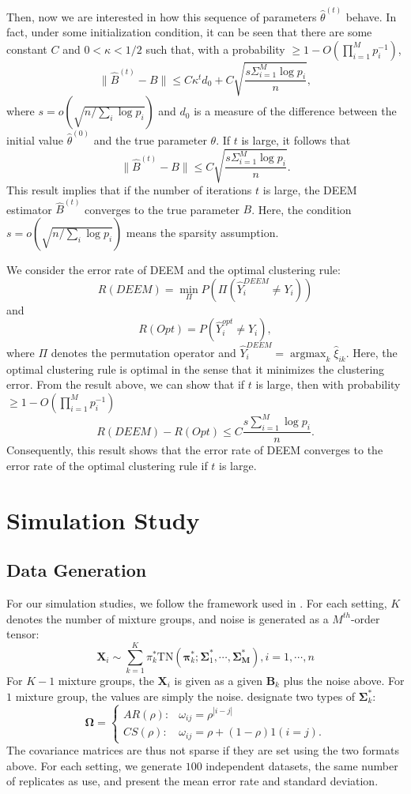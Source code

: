\documentclass[11pt]{article}
\newcommand{\amax}{\operatorname*{argmax}}
\newcommand{\wh}{\widehat}
\begin{document}
Then, now we are interested in how this sequence of parameters $\wh\theta^{(t)}$ behave.
In fact, under some initialization condition, it can be seen that there are some constant $C$ and $0<\kappa<1/2$ such that, with a probability $\ge 1- O(\prod_{i=1}^M p_i^{-1})$,
$$
\|\wh B^{(t)} - B\| \le C \kappa^t d_0 + C\sqrt{\frac{s \Sigma_{i=1}^M \log p_i}{n}},
$$
where $s=o(\sqrt{n/\sum_i \log p_i})$ and $d_0$ is a measure of the difference between the initial value $\wh \theta^{(0)}$ and the true parameter $\theta$.
If  $t$ is large, it follows that
$$
\|\wh B^{(t)} - B\| \le C\sqrt{\frac{s \Sigma_{i=1}^M \log p_i}{n}}.
$$
This result implies that if the number of iterations $t$ is large, the DEEM estimator $\wh B^{(t)}$ converges to the true parameter $B$.
Here, the condition $s=o(\sqrt{n/\sum_i \log p_i})$ means the sparsity assumption.

We consider the error rate of DEEM and the optimal clustering rule:
$$
R(DEEM)= \min_{\Pi} P(\Pi(\wh Y_i^{DEEM} \neq Y_i))
$$
and
$$
R(Opt)= P(\wh Y_i^{opt} \neq Y_i),
$$
where $\Pi$ denotes the permutation operator and $\wh Y_i^{DEEM}= \amax_k \wh\xi_{ik}$.
Here, the optimal clustering rule is optimal in the sense that it minimizes the clustering error.
From the result above, we can show that if $t$ is large, then with probability $\ge 1- O(\prod_{i=1}^M p_i^{-1})$
$$
R(DEEM) - R(Opt) \le C \frac{s\sum_{i=1}^M \log p_i}{n}.
$$
Consequently, this result shows that the error rate of DEEM converges to the error rate of the optimal clustering rule if $t$ is large.


\section{Simulation Study}

\subsection{Data Generation}

For our simulation studies, we follow the framework used in \cite{mai2022DEEM}. For each setting, $K$ denotes the number of mixture groups, and noise is generated as a $M^{th}$-order tensor:  
\begin{equation}
    \mathbf{X}_i \sim \sum_{k=1}^K \pi^*_k \mbox{TN} (\boldsymbol{\pi}^*_k; \boldsymbol{\Sigma}^*_1, \cdots, \boldsymbol{\Sigma^*_M}), i = 1, \cdots, n
\end{equation}
For $K-1$ mixture groups, the $\mathbf{X}_i$ is given as a given $\mathbf{B}_k$ plus the noise above. For $1$ mixture group, the values are simply the noise. \cite{mai2022DEEM} designate two types of $\boldsymbol{\Sigma}^*_k$: 
\[  \boldsymbol{\Omega} =   \begin{cases}
     AR(\rho): & \omega_{ij} = \rho^{|i-j|} \\
    CS(\rho): & \omega_{ij} = \rho + (1-\rho) 1(i=j).
\end{cases}\]
The covariance matrices are thus not sparse if they are set using the two formats above. For each setting, we generate $100$ independent datasets, the same number of replicates as \cite{mai2022DEEM} use, and present the mean error rate and standard deviation. 
\end{document}
